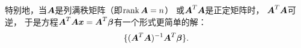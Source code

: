 特别地，当\(\boldsymbol{A}\)是列满秩矩阵（即\(\rank\boldsymbol{A} = n\)）
或\(\boldsymbol{A}^T \boldsymbol{A}\)是正定矩阵时，
\(\boldsymbol{A}^T \boldsymbol{A}\)可逆，
于是方程\(\boldsymbol{A}^T \boldsymbol{A} \boldsymbol{x} = \boldsymbol{A}^T \boldsymbol\beta\)有一个形式更简单的解：\begin{equation*}
	\{
		(\boldsymbol{A}^T \boldsymbol{A})^{-1} \boldsymbol{A}^T \boldsymbol\beta
	\}.
\end{equation*}
